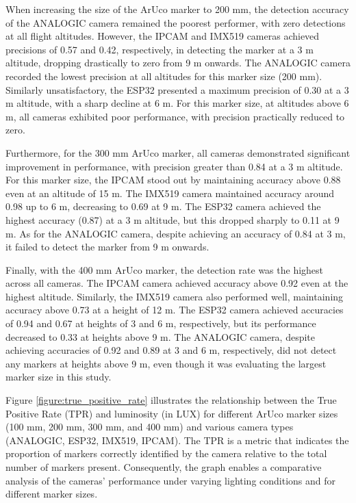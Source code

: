 \documentclass[letterpaper]{article}
\begin{document}
When increasing the size of the ArUco marker to 200 mm, the detection accuracy of the ANALOGIC camera remained the poorest performer, with zero detections at all flight altitudes. However, the IPCAM and IMX519 cameras achieved precisions of 0.57 and 0.42, respectively, in detecting the marker at a 3 m altitude, dropping drastically to zero from 9 m onwards. The ANALOGIC camera recorded the lowest precision at all altitudes for this marker size (200 mm). Similarly unsatisfactory, the ESP32 presented a maximum precision of 0.30 at a 3 m altitude, with a sharp decline at 6 m. For this marker size, at altitudes above 6 m, all cameras exhibited poor performance, with precision practically reduced to zero.

Furthermore, for the 300 mm ArUco marker, all cameras demonstrated significant improvement in performance, with precision greater than 0.84 at a 3 m altitude. For this marker size, the IPCAM stood out by maintaining accuracy above 0.88 even at an altitude of 15 m. The IMX519 camera maintained accuracy around 0.98 up to 6 m, decreasing to 0.69 at 9 m. The ESP32 camera achieved the highest accuracy (0.87) at a 3 m altitude, but this dropped sharply to 0.11 at 9 m. As for the ANALOGIC camera, despite achieving an accuracy of 0.84 at 3 m, it failed to detect the marker from 9 m onwards.

Finally, with the 400 mm ArUco marker, the detection rate was the highest across all cameras. The IPCAM camera achieved accuracy above 0.92 even at the highest altitude. Similarly, the IMX519 camera also performed well, maintaining accuracy above 0.73 at a height of 12 m. The ESP32 camera achieved accuracies of 0.94 and 0.67 at heights of 3 and 6 m, respectively, but its performance decreased to 0.33 at heights above 9 m. The ANALOGIC camera, despite achieving accuracies of 0.92 and 0.89 at 3 and 6 m, respectively, did not detect any markers at heights above 9 m, even though it was evaluating the largest marker size in this study.

Figure \ref{figure:true_positive_rate} illustrates the relationship between the True Positive Rate (TPR) and luminosity (in LUX) for different ArUco marker sizes (100 mm, 200 mm, 300 mm, and 400 mm) and various camera types (ANALOGIC, ESP32, IMX519, IPCAM). The TPR is a metric that indicates the proportion of markers correctly identified by the camera relative to the total number of markers present. Consequently, the graph enables a comparative analysis of the cameras' performance under varying lighting conditions and for different marker sizes.
\end{document}
